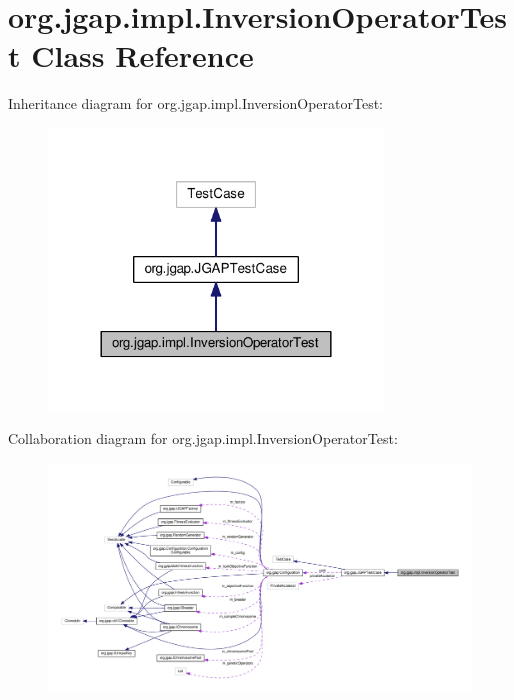 \hypertarget{classorg_1_1jgap_1_1impl_1_1_inversion_operator_test}{\section{org.\-jgap.\-impl.\-Inversion\-Operator\-Test Class Reference}
\label{classorg_1_1jgap_1_1impl_1_1_inversion_operator_test}
}


Inheritance diagram for org.\-jgap.\-impl.\-Inversion\-Operator\-Test\-:
\nopagebreak
\begin{figure}[H]
\begin{center}
\leavevmode
\includegraphics[width=252pt]{classorg_1_1jgap_1_1impl_1_1_inversion_operator_test__inherit__graph}
\end{center}
\end{figure}


Collaboration diagram for org.\-jgap.\-impl.\-Inversion\-Operator\-Test\-:
\nopagebreak
\begin{figure}[H]
\begin{center}
\leavevmode
\includegraphics[width=350pt]{classorg_1_1jgap_1_1impl_1_1_inversion_operator_test__coll__graph}
\end{center}
\end{figure}
